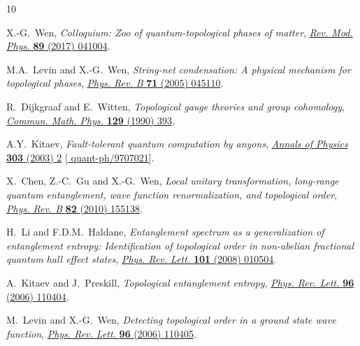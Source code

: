 \documentclass[11pt,nofootinbib,preprint]{revtex4-1}
\begin{document}


%
 
\begin{thebibliography}{10}

X.-G.~Wen, \emph{Colloquium: Zoo of quantum-topological phases of matter},
  \href{https://doi.org/10.1103/RevModPhys.89.041004}{\emph{Rev. Mod. Phys.}
  {\bfseries 89} (2017) 041004}.

M.A.~Levin and X.-G.~Wen, \emph{String-net condensation: A physical mechanism
  for topological phases},
  \href{https://doi.org/10.1103/PhysRevB.71.045110}{\emph{Phys. Rev. B}
  {\bfseries 71} (2005) 045110}.

R.~Dijkgraaf and E.~Witten, \emph{Topological gauge theories and group
  cohomology}, \href{https://doi.org/10.1007/BF02096988}{\emph{Commun. Math.
  Phys.} {\bfseries 129} (1990) 393}.

A.Y.~{Kitaev}, \emph{{Fault-tolerant quantum computation by anyons}},
  \href{https://doi.org/10.1016/S0003-4916(02)00018-0}{\emph{Annals of Physics}
  {\bfseries 303} (2003) 2}
  [\href{https://arxiv.org/abs/quant-ph/9707021}{{\ttfamily
  quant-ph/9707021}}].

X.~Chen, Z.-C.~Gu and X.-G.~Wen, \emph{Local unitary transformation, long-range
  quantum entanglement, wave function renormalization, and topological order},
  \href{https://doi.org/10.1103/PhysRevB.82.155138}{\emph{Phys. Rev. B}
  {\bfseries 82} (2010) 155138}.

H.~Li and F.D.M.~Haldane, \emph{Entanglement spectrum as a generalization of
  entanglement entropy: Identification of topological order in non-abelian
  fractional quantum hall effect states},
  \href{https://doi.org/10.1103/PhysRevLett.101.010504}{\emph{Phys. Rev. Lett.}
  {\bfseries 101} (2008) 010504}.

A.~Kitaev and J.~Preskill, \emph{Topological entanglement entropy},
  \href{https://doi.org/10.1103/PhysRevLett.96.110404}{\emph{Phys. Rev. Lett.}
  {\bfseries 96} (2006) 110404}.

M.~Levin and X.-G.~Wen, \emph{Detecting topological order in a ground state
  wave function},
  \href{https://doi.org/10.1103/PhysRevLett.96.110405}{\emph{Phys. Rev. Lett.}
  {\bfseries 96} (2006) 110405}.


\end{thebibliography}
\end{document}
